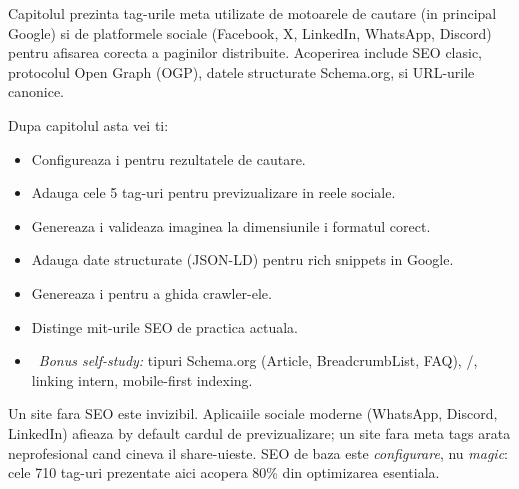 \clearpage
{}
\setcounter{section}{0}
{}

Capitolul prezinta tag-urile meta utilizate de motoarele de cautare (in principal Google) si de platformele sociale (Facebook, X, LinkedIn, WhatsApp, Discord) pentru afisarea corecta a paginilor distribuite. Acoperirea include SEO clasic, protocolul Open Graph (OGP), datele structurate Schema.org, si URL-urile canonice.

\bigskip

\begin{outcomes}
Dupa capitolul asta vei ti:
\begin{itemize}[itemsep=1pt]
  \item Configureaza  i  pentru rezultatele de cautare.
  \item Adauga cele 5 tag-uri  pentru previzualizare in reele sociale.
  \item Genereaza i valideaza imaginea  la dimensiunile i formatul corect.
  \item Adauga date structurate (JSON-LD) pentru rich snippets in Google.
  \item Genereaza  i  pentru a ghida crawler-ele.
  \item Distinge mit-urile SEO de practica actuala.
  \item \faRocket\ \emph{Bonus self-study:} tipuri Schema.org (Article, BreadcrumbList, FAQ), /, linking intern, mobile-first indexing.
\end{itemize}
\end{outcomes}

\begin{whymatters}
Un site fara SEO este invizibil. Aplicaiile sociale moderne (WhatsApp, Discord, LinkedIn) afieaza by default cardul de previzualizare; un site fara meta tags arata neprofesional cand cineva il share-uieste. SEO de baza este \emph{configurare}, nu \emph{magic}: cele 7\textendash{}10 tag-uri prezentate aici acopera 80\% din optimizarea esentiala.
\end{whymatters}


